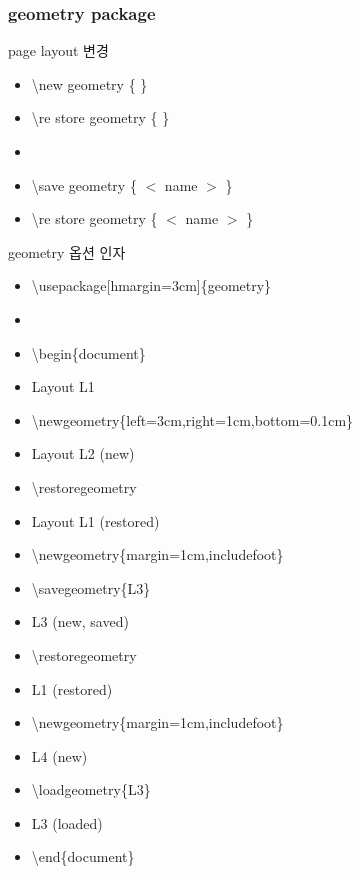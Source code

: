 \documentclass[ aspectratio=149,  14pt,blue,xcolor=pdftex,dvipsnames,table,handout,notes]{beamer}
\begin{document}
		\begin{frame}[t]
		\frametitle{geometry package}

			\begin{block} {page layout 변경}
			\begin{itemize}
			\item[] \textbackslash new geometry \{ \}
			\item[] \textbackslash re store geometry \{ \}
			\item[] 
			\item[] \textbackslash save geometry \{ \(<\) name \(>\)  \}
			\item[] \textbackslash re store geometry \{ \(<\) name \(>\)  \}
			\end{itemize}

			\end{block}


			\begin{example} {geometry 옵션 인자}
			\begin{itemize}
			\item[] \textbackslash usepackage[hmargin=3cm]\{geometry\}
			\item[] 
			\item[] \textbackslash begin\{document\}
			\item[] \hspace{4em}	Layout L1
			\item[] \textbackslash newgeometry\{left=3cm,right=1cm,bottom=0.1cm\}
			\item[] \hspace{4em}	Layout L2 (new)
			\item[] \textbackslash restoregeometry
			\item[] \hspace{4em}	Layout L1 (restored)
			\item[] \textbackslash newgeometry\{margin=1cm,includefoot\}
			\item[] \textbackslash savegeometry\{L3\}
			\item[] \hspace{4em}	L3 (new, saved)
			\item[] \textbackslash restoregeometry
			\item[] \hspace{4em}	L1 (restored)
			\item[] \textbackslash newgeometry\{margin=1cm,includefoot\}
			\item[] \hspace{4em}	L4 (new)
			\item[] \textbackslash loadgeometry\{L3\}
			\item[] \hspace{4em}	L3 (loaded)
			\item[] \textbackslash end\{document\}
			\end{itemize}
			\end{example}


		\end{frame}
\end{document}
